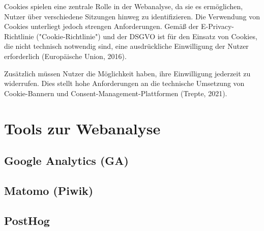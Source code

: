 Cookies spielen eine zentrale Rolle in der Webanalyse, da sie es ermöglichen, Nutzer über verschiedene Sitzungen hinweg zu identifizieren. Die Verwendung von Cookies unterliegt jedoch strengen Anforderungen. Gemäß der E-Privacy-Richtlinie ("Cookie-Richtlinie") und der DSGVO ist für den Einsatz von Cookies, die nicht technisch notwendig sind, eine ausdrückliche Einwilligung der Nutzer erforderlich (Europäische Union, 2016). %

Zusätzlich müssen Nutzer die Möglichkeit haben, ihre Einwilligung jederzeit zu widerrufen. Dies stellt hohe Anforderungen an die technische Umsetzung von Cookie-Bannern und Consent-Management-Plattformen (Trepte, 2021).

\section{Tools zur Webanalyse} %

\subsection{Google Analytics (GA)}
\subsection{Matomo (Piwik)}
\subsection{PostHog}